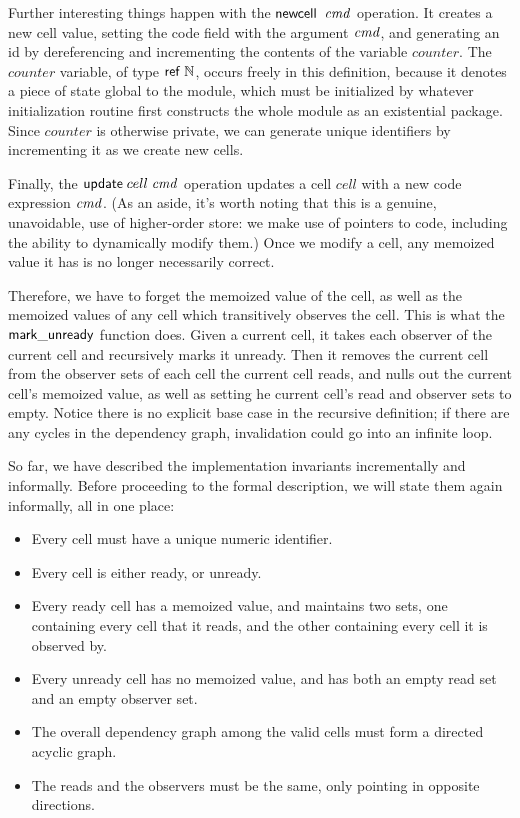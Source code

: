 Further interesting things happen with the $\mathsf{newcell}\;\;\mathit{cmd}$ operation.
It creates a new cell value, setting the code field with the argument
$\mathit{cmd}$, and generating an id by dereferencing and incrementing the
contents of the variable $counter$. The $counter$ variable, of type
$\mathsf{ref}\;\mathbb{N}$, occurs freely in this definition, because it denotes a
piece of state global to the module, which must be initialized by
whatever initialization routine first constructs the whole module as
an existential package.  Since $counter$ is otherwise private, we can
generate unique identifiers by incrementing it as we create new cells.

Finally, the $\mathsf{update}\;cell\;\mathit{cmd}$ operation updates a cell
$cell$ with a new code expression $\mathit{cmd}$. (As an aside, it's worth
noting that this is a genuine, unavoidable, use of higher-order store:
we make use of pointers to code, including the ability to dynamically
modify them.) Once we modify a cell, any memoized value it has is no
longer necessarily correct.

Therefore, we have to forget the memoized value of the cell, as well
as the memoized values of any cell which transitively observes the
cell. This is what the $\mathsf{mark\_unready}$ function does. Given a
current cell, it takes each observer of the current cell and
recursively marks it unready. Then it removes the current cell from
the observer sets of each cell the current cell reads, and nulls out
the current cell's memoized value, as well as setting he current
cell's read and observer sets to empty. Notice there is no explicit
base case in the recursive definition; if there are any cycles in the
dependency graph, invalidation could go into an infinite loop.

So far, we have described the implementation invariants incrementally
and informally. Before proceeding to the formal description, we will
state them again informally, all in one place:

\begin{itemize}
  \item Every cell must have a unique numeric identifier.
  \item Every cell is either ready, or unready. 
  \item Every ready cell has a memoized value, and maintains 
    two sets, one containing every cell that it reads, and the
    other containing every cell it is observed by. 
  \item Every unready cell has no memoized value, and has 
    both an empty read set and an empty observer set. 
  \item The overall dependency graph among the valid cells must form a
    directed acyclic graph. 
  \item The reads and the observers must be the same, only 
    pointing in opposite directions.
\end{itemize}

